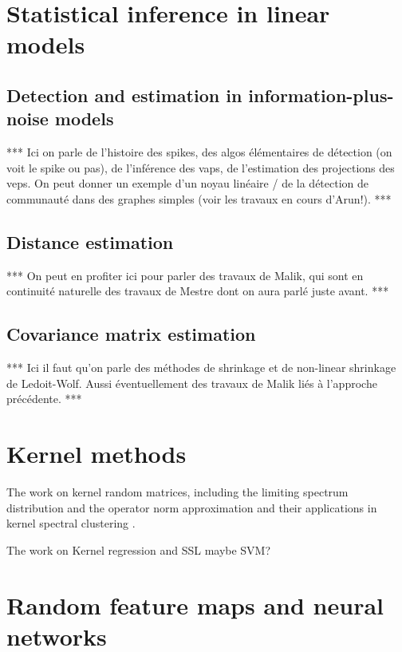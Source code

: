 \documentclass[MAL,biber]{nowfnt} %
\newcommand{\RED}{\color[rgb]{0.70,0,0}}
\begin{document}
{\RED 

\section{Statistical inference in linear models}

\subsection{Detection and estimation in information-plus-noise models}

*** Ici on parle de l'histoire des spikes, des algos élémentaires de détection (on voit le spike ou pas), de l'inférence des vaps, de l'estimation des projections des veps. On peut donner un exemple d'un noyau linéaire / de la détection de communauté dans des graphes simples (voir les travaux en cours d'Arun!). ***

\subsection{Distance estimation}

*** On peut en profiter ici pour parler des travaux de Malik, qui sont en continuité naturelle des travaux de Mestre dont on aura parlé juste avant. ***

\subsection{Covariance matrix estimation}

*** Ici il faut qu'on parle des méthodes de shrinkage et de non-linear shrinkage de Ledoit-Wolf. Aussi éventuellement des travaux de Malik liés à l'approche précédente. ***

}

\section{Kernel methods}
\label{sec:kernel-methods}

The work on kernel random matrices, including the limiting spectrum distribution and the operator norm approximation \citep{el2010spectrum,el2010information,cheng2013spectrum} and their applications in kernel spectral clustering \citep{couillet2016kernel}. 

The work on Kernel regression \citep{liao2019large} and SSL \cite{mai2018random} maybe SVM? 

\section{Random feature maps and neural networks}
\end{document}
